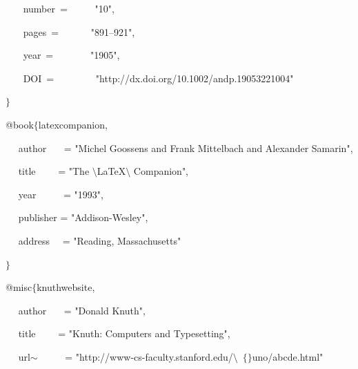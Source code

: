 \begin{itemize}
~~~ \hspace*{0.5in}number~=~~~~~  "10",\par

~~~ \hspace*{0.5in}pages~=~~~~~~  "891--921",\par

~~~ \hspace*{0.5in}year~=~~~~~~~  "1905",\par

~~~ \hspace*{0.5in}DOI~=~~~~~~~~  "http://dx.doi.org/10.1002/andp.19053221004"\par

$ \} $\par

 \par

@book$ \{ $latexcompanion,\par

 \hspace*{0.5in}~~ author~~~ = "Michel Goossens and Frank Mittelbach and Alexander Samarin",\par

 \hspace*{0.5in}~~ title~~~~ = "The $\setminus$LaTeX$\setminus$ Companion",\par

 \hspace*{0.5in}~~ year~~~~~ = "1993",\par

 \hspace*{0.5in}~~ publisher = "Addison-Wesley",\par

 \hspace*{0.5in}~~ address~~ = "Reading, Massachusetts"\par

$ \} $\par

 \par

@misc$ \{ $knuthwebsite,\par

 \hspace*{0.5in}~~ author~~~ = "Donald Knuth",\par

 \hspace*{0.5in}~~ title~~~~ = "Knuth: Computers and Typesetting",\par

 \hspace*{0.5in}~~ url$ \sim $~~~~~ = "http://www-cs-faculty.stanford.edu/$\setminus$~$ \{ $$ \} $uno/abcde.html"\par


\end{itemize}
